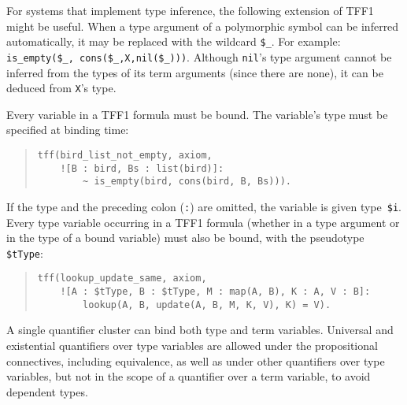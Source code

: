 For systems that implement type inference, the following %
extension of TFF1 might be useful. When a type argument of
a polymorphic symbol can be inferred automatically, it may be
replaced with the wildcard {\tt \$\_}. For example:
{\tt is\_empty(\$\_,\allowbreak\;\,cons(\$\_,\allowbreak\;X,\;nil(\$\_)))}.
Although {\tt nil}'s type argument cannot be inferred from the types of
its term arguments (since there are none), it can be
deduced from {\texttt X}'s type.

Every variable in a TFF1 formula must be bound. The variable's type must be specified
at binding time:
\begin{quote}
\begin{verbatim}
tff(bird_list_not_empty, axiom,
    ![B : bird, Bs : list(bird)]:
        ~ is_empty(bird, cons(bird, B, Bs))).
\end{verbatim}
\end{quote}

\pagebreak[3] %

\noindent
If the type and the preceding colon ({\tt :}) are omitted, the variable is given
type~{\tt\$i}. Every type variable occurring in a TFF1 formula
(whether in a type argument or in the type of a bound variable)
must also be bound, with the pseudotype {\tt\$tType}:
\begin{quote}
\begin{verbatim}
tff(lookup_update_same, axiom,
    ![A : $tType, B : $tType, M : map(A, B), K : A, V : B]:
        lookup(A, B, update(A, B, M, K, V), K) = V).
\end{verbatim}
\end{quote}

A single quantifier cluster can bind both type %
and term variables.
Universal and existential quantifiers over type variables are allowed under the
propositional connectives, including equivalence, as well as under other
quantifiers over type variables, but not in the scope of a quantifier over a
term variable, to avoid dependent types.

